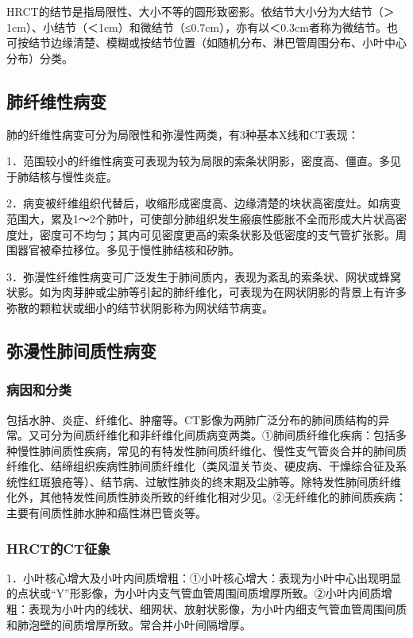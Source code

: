 HRCT的结节是指局限性、大小不等的圆形致密影。依结节大小分为大结节（＞1cm）、小结节（＜1cm）和微结节（≤0.7cm），亦有以＜0.3cm者称为微结节。也可按结节边缘清楚、模糊或按结节位置（如随机分布、淋巴管周围分布、小叶中心分布）分类。

\subsection{肺纤维性病变}

肺的纤维性病变可分为局限性和弥漫性两类，有3种基本X线和CT表现：

1．范围较小的纤维性病变可表现为较为局限的索条状阴影，密度高、僵直。多见于肺结核与慢性炎症。

2．病变被纤维组织代替后，收缩形成密度高、边缘清楚的块状高密度灶。如病变范围大，累及1～2个肺叶，可使部分肺组织发生瘢痕性膨胀不全而形成大片状高密度灶，密度可不均匀；其内可见密度更高的索条状影及低密度的支气管扩张影。周围器官被牵拉移位。多见于慢性肺结核和矽肺。

3．弥漫性纤维性病变可广泛发生于肺间质内，表现为紊乱的索条状、网状或蜂窝状影。如为肉芽肿或尘肺等引起的肺纤维化，可表现为在网状阴影的背景上有许多弥散的颗粒状或细小的结节状阴影称为网状结节病变。

\subsection{弥漫性肺间质性病变}

\subsubsection{病因和分类}

包括水肿、炎症、纤维化、肿瘤等。CT影像为两肺广泛分布的肺间质结构的异常。又可分为间质纤维化和非纤维化间质病变两类。①肺间质纤维化疾病：包括多种慢性肺间质性疾病，常见的有特发性肺间质纤维化、慢性支气管炎合并的肺间质纤维化、结缔组织疾病性肺间质纤维化（类风湿关节炎、硬皮病、干燥综合征及系统性红斑狼疮等）、结节病、过敏性肺炎的终末期及尘肺等。除特发性肺间质纤维化外，其他特发性间质性肺炎所致的纤维化相对少见。②无纤维化的肺间质疾病：主要有间质性肺水肿和癌性淋巴管炎等。

\subsubsection{HRCT的CT征象}

1．小叶核心增大及小叶内间质增粗：①小叶核心增大：表现为小叶中心出现明显的点状或“Y”形影像，为小叶内支气管血管周围间质增厚所致。②小叶内间质增粗：表现为小叶内的线状、细网状、放射状影像，为小叶内细支气管血管周围间质和肺泡壁的间质增厚所致。常合并小叶间隔增厚。

